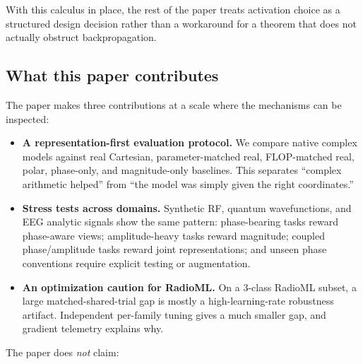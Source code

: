 \documentclass{article}
\begin{document}
With this calculus in place, the rest of the paper treats activation
choice as a structured design decision rather than a workaround for a
theorem that does not actually obstruct backpropagation.

\subsection{What this paper contributes}

The paper makes three contributions at a scale where the mechanisms
can be inspected:

\begin{itemize}
  \item \textbf{A representation-first evaluation protocol.} We compare
    native complex models against real Cartesian, parameter-matched
    real, FLOP-matched real, polar, phase-only, and magnitude-only
    baselines. This separates ``complex arithmetic helped'' from
    ``the model was simply given the right coordinates.''
  \item \textbf{Stress tests across domains.} Synthetic RF, quantum
    wavefunctions, and EEG analytic signals show the same pattern:
    phase-bearing tasks reward phase-aware views; amplitude-heavy tasks
    reward magnitude; coupled phase/amplitude tasks reward joint
    representations; and unseen phase conventions require explicit
    testing or augmentation.
  \item \textbf{An optimization caution for RadioML.} On a 3-class
    RadioML subset, a large matched-shared-trial gap is mostly a
    high-learning-rate robustness artifact. Independent per-family
    tuning gives a much smaller gap, and gradient telemetry explains
    why.
\end{itemize}

\noindent The paper does \emph{not} claim:
\end{document}
